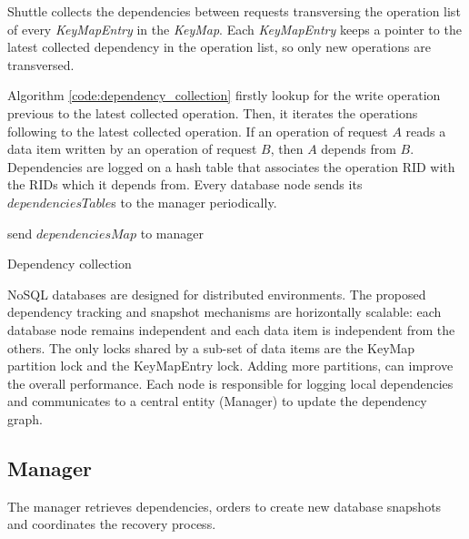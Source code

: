 Shuttle collects the dependencies between requests transversing the operation list of every \emph{KeyMapEntry} in the \emph{KeyMap}. Each \emph{KeyMapEntry} keeps a pointer to the latest collected dependency in the operation list, so only new operations are transversed.

Algorithm \ref{code:dependency_collection} firstly lookup for the write operation previous to the latest collected operation. Then, it iterates the operations following to the latest collected operation. If an operation of request $A$ reads a data item written by an operation of request $B$, then $A$ depends from $B$. Dependencies are logged on a hash table that associates the operation \ac{RID} with the \ac{RID}s which it depends from. Every database node sends its $dependenciesTable$s to the manager periodically. 

 
\begin{algorithm}[H]
\DontPrintSemicolon{}
	\;
	\BlankLine
	\BlankLine
	send $dependenciesMap$ to manager\;

 \caption{Dependency collection}
\label{code:dependency_collection}
\end{algorithm}


\acs{NoSQL} databases are designed for distributed environments. The proposed dependency tracking and snapshot mechanisms are horizontally scalable: each database node remains independent and each data item is independent from the others. The only locks shared by a sub-set of data items are the KeyMap partition lock and the KeyMapEntry lock. Adding more partitions, can improve the overall performance. Each node is responsible for logging local dependencies and communicates to a central entity (Manager) to update the  dependency graph. 


\subsection{Manager}\label{sec:impl:normal:manager}
The manager retrieves dependencies, orders to create new database snapshots and coordinates the recovery process. 

